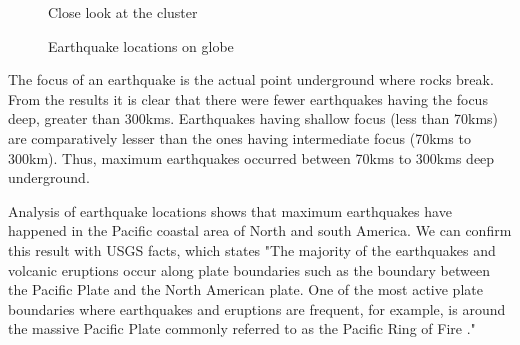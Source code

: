 \documentclass[9pt,twocolumn,twoside]{../../styles/osajnl}
\begin{document}
\begin{figure}[htbp]
\centering
{}
\caption{Close look at the cluster} 
\label{fig:figure6}
\end{figure}


\begin{figure}[htbp]
\centering
{}
\caption{Earthquake locations on globe} 
\label{fig:figure7}
\end{figure}

The focus of an earthquake is the actual point underground where rocks break. From the results it is clear that there were fewer earthquakes having the focus deep, greater than 300kms. Earthquakes having shallow focus (less than 70kms) are comparatively lesser than the ones having intermediate focus (70kms to 300km). Thus, maximum earthquakes occurred between 70kms to 300kms deep underground.

Analysis of earthquake locations shows that maximum earthquakes have happened in the Pacific coastal area of North and south America. We can confirm this result with USGS facts, which states "The majority of the earthquakes and volcanic eruptions occur along plate boundaries such as the boundary between the Pacific Plate and the North American plate. One of the most active plate boundaries where earthquakes and eruptions are frequent, for example, is around the massive Pacific Plate commonly referred to as the Pacific Ring of Fire \cite{www-usgs4}."
\end{document}
